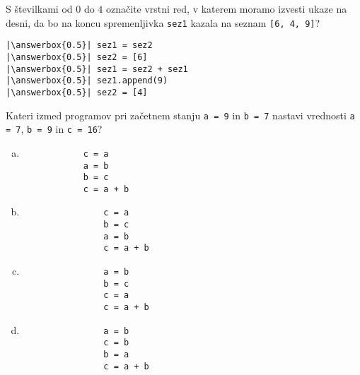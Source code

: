 \documentclass[arhiv, 10pt]{../izpit}
\newcommand{\inlinepy}[1]{\texttt{#1}}
\newcommand{\answerbox}[1]{\framebox{\vphantom{\large M}\hspace{#1cm}}}
\begin{document}
        \naloga*
        \begin{multicols}{2}
        \noindent 
        S številkami od $0$ do $4$ označite vrstni red, v katerem moramo izvesti ukaze na desni, da bo na koncu spremenljivka \inlinepy{sez1} kazala na seznam \inlinepy{[6, 4, 9]}?
    
        \columnbreak
        \noindent
        \begin{verbatim}
|\answerbox{0.5}| sez1 = sez2
|\answerbox{0.5}| sez2 = [6]
|\answerbox{0.5}| sez1 = sez2 + sez1
|\answerbox{0.5}| sez1.append(9)
|\answerbox{0.5}| sez2 = [4]

        \end{verbatim}
        \end{multicols}
    
            
        \naloga*
        
        Kateri izmed programov pri začetnem stanju
            \inlinepy{a = 9} in
            \inlinepy{b = 7}
        nastavi vrednosti
            \inlinepy{a = 7},
            \inlinepy{b = 9} in
            \inlinepy{c = 16}?
    
        \begin{multicols}{4}
        \begin{enumerate}[(a)]
\item 
            \begin{verbatim}
            c = a
            a = b
            b = c
            c = a + b
            \end{verbatim}
        
\item 
                \begin{verbatim}
                c = a
                b = c
                a = b
                c = a + b
                \end{verbatim}
            
\item 
                \begin{verbatim}
                a = b
                b = c
                c = a
                c = a + b
                \end{verbatim}
            
\item 
                \begin{verbatim}
                a = b
                c = b
                b = a
                c = a + b
                \end{verbatim}
            
\end{enumerate}

        \end{multicols}
    
\end{document}
